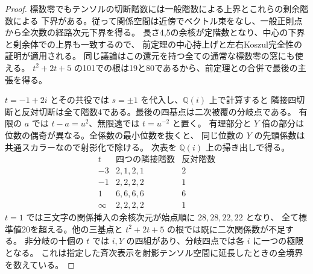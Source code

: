 \begin{proof}
標数零でもテンソルの切断階数には一般階数による上界とこれらの剰余階数による
下界がある。従って関係空間は近傍でベクトル束をなし、一般正則点から全次数の経路次元下界を得る。
長さ4,5の余核が定階数となり、中心の下界と剰余体での上界も一致するので、
前定理の中心持上げと左右Koszul完全性の証明が適用される。
同じ議論はこの還元を持つ全ての通常な標数零の窓にも使える。
$t^2+2t+5$ の101での根は19と80であるから、前定理との合併で最後の主張を得る。

$t=-1+2i$ とその共役では $s=\pm1$ を代入し、$\mathbb Q(i)$ 上で計算すると
隣接四切断と反対切断は全て階数4である。最後の四基点は二次被覆の分岐点である。
有限の $a$ では $t-a=u^2$、無限遠では $t=u^{-2}$ と置く。
有理部分と $Y$ 倍の部分は位数の偶奇が異なる。全係数の最小位数を抜くと、
同じ位数の $Y$ の先頭係数は共通スカラーなので射影化で除ける。
次表を $\mathbb Q(i)$ 上の掃き出しで得る。
\[
\begin{array}{c|c|c}
 t & \text{四つの隣接階数} & \text{反対階数}\\\hline
 -3 & 2,1,2,1&2\\
 -1 & 2,2,2,2&1\\
  1 & 6,6,6,6&6\\
 \infty&2,2,2,2&1
\end{array}
\]
$t=1$ では三文字の関係挿入の余核次元が始点順に $28,28,22,22$ となり、
全て標準値20を超える。他の三基点と $t^2+2t+5$ の根では既に二次関係数が不足する。
非分岐の十個の $t$ では $i,Y$ の四組があり、分岐四点では各 $i$ に一つの極限となる。
これは指定した斉次表示を射影テンソル空間に延長したときの全境界を数えている。
\end{proof}
